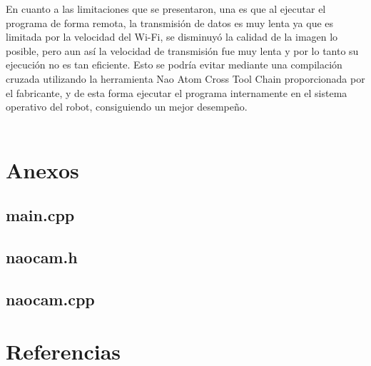 \documentclass[letterpaper]{article}
\begin{document}
En cuanto a las limitaciones que se presentaron, una es que al ejecutar el programa de forma remota, la transmisión de datos es muy lenta ya que es limitada por la velocidad del Wi-Fi, se disminuyó la calidad de la imagen lo posible, pero aun así la velocidad de transmisión fue muy lenta y por lo tanto su ejecución no es tan eficiente.  Esto se podría evitar mediante una compilación cruzada utilizando la herramienta Nao Atom Cross Tool Chain proporcionada por el fabricante, y de esta forma ejecutar el programa internamente en el sistema operativo del robot, consiguiendo un mejor desempeño.\\\\

\section{Anexos}
\subsection{main.cpp}

\subsection{naocam.h}

\subsection{naocam.cpp}

\section{Referencias}
\end{document}
